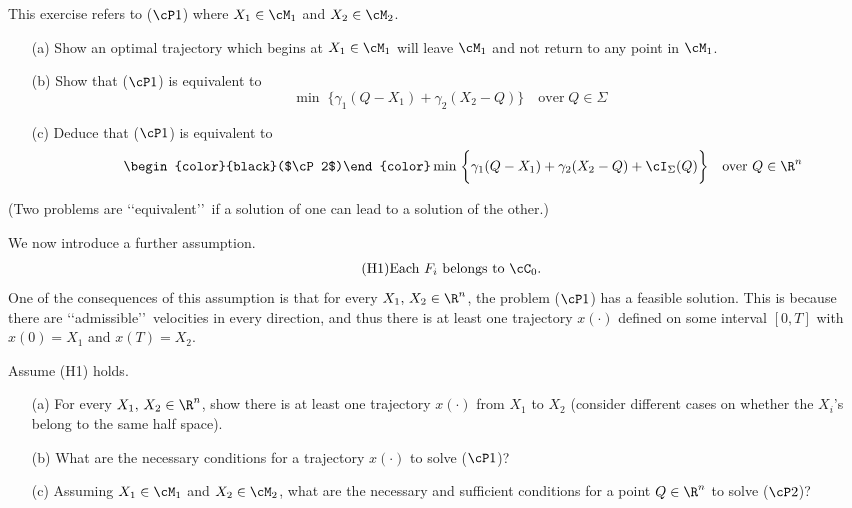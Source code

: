 \documentclass[12pt]{article}
\begin{document}
{\blue
\begin{exer}\label{exer: 1}  This exercise refers to ($\cP1$) where $X_1\in\cM_1$ and $X_2\in\cM_2$.
\begin{itemize} 
\item[(a)]  Show an optimal trajectory which begins at $X_1\in\cM_1$ will leave $\cM_1$ and not return to any point in $\cM_1$.
\item[(b)]  Show that ($\cP1$) is equivalent to
\begin{equation*}\label{eq: prob}
\min\;\biggl\{\gamma_1(Q-X_1)+\gamma_2(X_2-Q)\biggr\}\quad\text{over}\;Q\in\Sigma
\end{equation*}
\item[(c)]  Deduce that ($\cP1$) is equivalent to
\begin{equation*}\tag*{\begin{color}{black}($\cP2$)\end{color}}
\min\;\biggl\{\gamma_1(Q-X_1)+\gamma_2(X_2-Q)+\cI_{\Sigma}(Q)\biggr\}\quad\text{over }Q\in\R^n
\end{equation*}
\end{itemize}
(Two problems are \lq\lq equivalent\rq\rq\ if a solution of one can lead to a solution of the other.)
\end{exer}
}

We now introduce a further assumption.
\begin{align}\tag{H1}
\text{Each }F_i \text{ belongs to }\cC_0.
\end{align}
One of the consequences of this assumption is that for every $X_1,\,X_2\in\R^n$, the problem ($\cP1$) has a feasible solution.  This is because there are \lq\lq admissible\rq\rq\ velocities in every direction, and thus there is at least one trajectory $x(\cdot)$ defined on some interval $[0,T]$ with $x(0)=X_1$ and $x(T)=X_2$.  

{\blue
\begin{exer}  Assume (H1) holds.
\begin{itemize}  
\item[(a)]  For every $X_1,\,X_2\in\R^n$, show there is at least one trajectory $x(\cdot)$ from $X_1$ to $X_2$ (consider different cases on whether the $X_i$'s belong to the same half space).
\item[(b)]  What are the necessary conditions for a trajectory $x(\cdot)$ to solve ($\cP1$)?
\item[(c)]  Assuming  $X_1\in\cM_1$ and $X_2\in\cM_2$, what are the necessary and sufficient conditions for a point $Q\in\R^n$ to solve ($\cP2$)?
\end{itemize}
\end{exer}}
\end{document}
